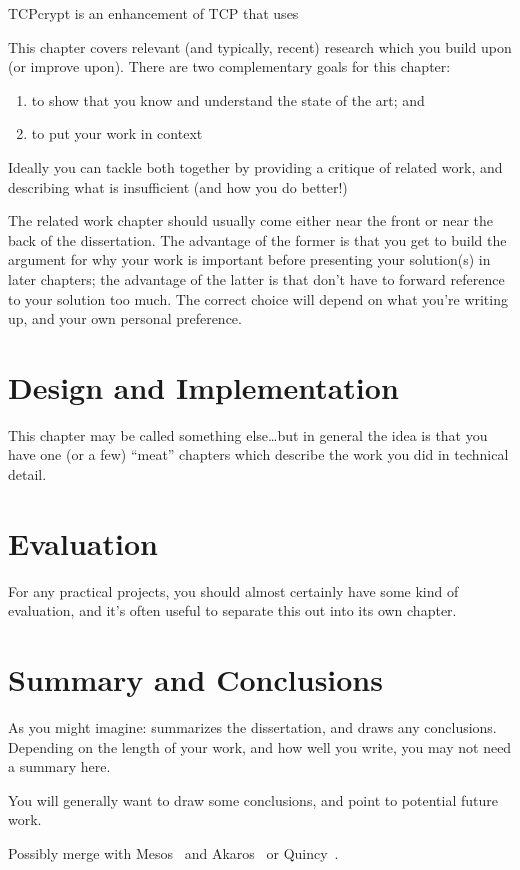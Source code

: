 \documentclass[a4paper,12pt,twoside,openright]{report}
\begin{document}
TCPcrypt is an enhancement of TCP that uses 


This chapter covers relevant (and typically, recent) research 
which you build upon (or improve upon). There are two complementary 
goals for this chapter: 
\begin{enumerate} 
  \item to show that you know and understand the state of the art; and 
  \item to put your work in context
\end{enumerate} 

Ideally you can tackle both together by providing a critique of
related work, and describing what is insufficient (and how you do
better!)

The related work chapter should usually come either near the front or
near the back of the dissertation. The advantage of the former is that
you get to build the argument for why your work is important before
presenting your solution(s) in later chapters; the advantage of the
latter is that don't have to forward reference to your solution too
much. The correct choice will depend on what you're writing up, and
your own personal preference.



\chapter{Design and Implementation} 

This chapter may be called something else\ldots but in general 
the idea is that you have one (or a few) ``meat'' chapters which
describe the work you did in technical detail. 


\chapter{Evaluation} 

For any practical projects, you should almost certainly have
some kind of evaluation, and it's often useful to separate 
this out into its own chapter. 


\chapter{Summary and Conclusions} 

As you might imagine: summarizes the dissertation, and draws 
any conclusions. Depending on the length of your work, and 
how well you write, you may not need a summary here. 

You will generally want to draw some conclusions, and point
to potential future work. 

Possibly merge with Mesos~\cite{Hindman:2011:MPF} and
Akaros~\cite{Rhoden:2011:IPE} or Quincy~\cite{Isard:2009:QFS}.



\appendix
\singlespacing

 
 
\end{document}
